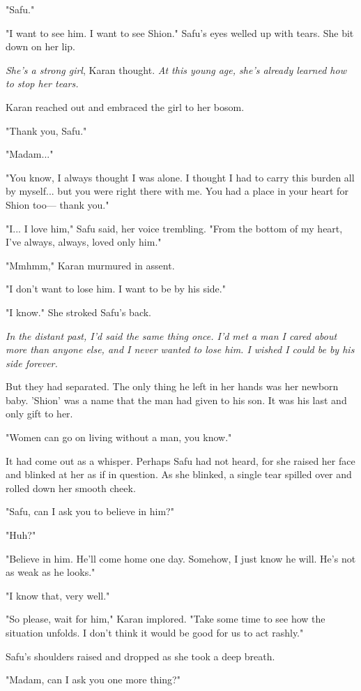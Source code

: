 "Safu."

"I want to see him. I want to see Shion." Safu's eyes welled up with
tears. She bit down on her lip.

\emph{She's a strong girl}, Karan thought. \emph{At this young age, she's already
learned how to stop her tears.}

Karan reached out and embraced the girl to her bosom.

"Thank you, Safu."

"Madam..."

"You know, I always thought I was alone. I thought I had to carry this
burden all by myself... but you were right there with me. You had a
place in your heart for Shion too--- thank you."

"I... I love him," Safu said, her voice trembling. "From the bottom of
my heart, I've always, always, loved only him."

"Mmhmm," Karan murmured in assent.

"I don't want to lose him. I want to be by his side."

"I know." She stroked Safu's back.

\emph{In the distant past, I'd said the same thing once. I'd met a man I cared
about more than anyone else, and I never wanted to lose him. I wished I
could be by his side forever.}

But they had separated. The only thing he left in her hands was her
newborn baby. 'Shion' was a name that the man had given to his son. It
was his last and only gift to her.

"Women can go on living without a man, you know."

It had come out as a whisper. Perhaps Safu had not heard, for she raised
her face and blinked at her as if in question. As she blinked, a single
tear spilled over and rolled down her smooth cheek.

"Safu, can I ask you to believe in him?"

"Huh?"

"Believe in him. He'll come home one day. Somehow, I just know he will.
He's not as weak as he looks."

"I know that, very well."

"So please, wait for him," Karan implored. "Take some time to see how
the situation unfolds. I don't think it would be good for us to act
rashly."

Safu's shoulders raised and dropped as she took a deep breath.

"Madam, can I ask you one more thing?"

